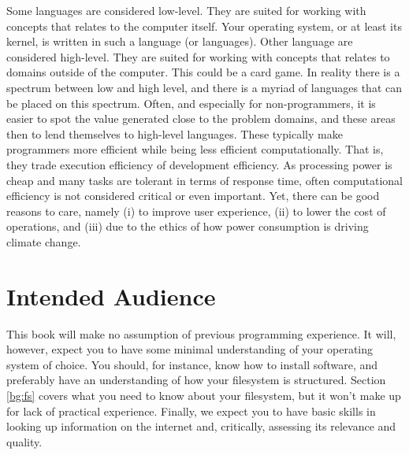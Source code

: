 Some languages are considered low-level. They are suited for working with concepts that relates to the computer itself. Your operating system, or at least its kernel, is written in such a language (or languages). Other language are considered high-level. They are suited for working with concepts that relates to domains outside of the computer. This could be a card game. In reality there is a spectrum between low and high level, and there is a myriad of languages that can be placed on this spectrum. Often, and especially for non-programmers, it is easier to spot the value generated close to the problem domains, and these areas then to lend themselves to high-level languages. These typically make programmers more efficient while being less efficient computationally. That is, they trade execution efficiency of development efficiency. As processing power is cheap and many tasks are tolerant in terms of response time, often computational efficiency is not considered critical or even important. Yet, there can be good reasons to care, namely (i) to improve user experience, (ii) to lower the cost of operations, and (iii) due to the ethics of how power consumption is driving climate change.


\section{Intended Audience}

This book will make no assumption of previous programming experience. It will, however, expect you to have some minimal understanding of your operating system of choice. You should, for instance, know how to install software, and preferably have an understanding of how your filesystem is structured. Section \ref{bg:fs} covers what you need to know about your filesystem, but it won't make up for lack of practical experience. Finally, we expect you to have basic skills in looking up information on the internet and, critically, assessing its relevance and quality.

